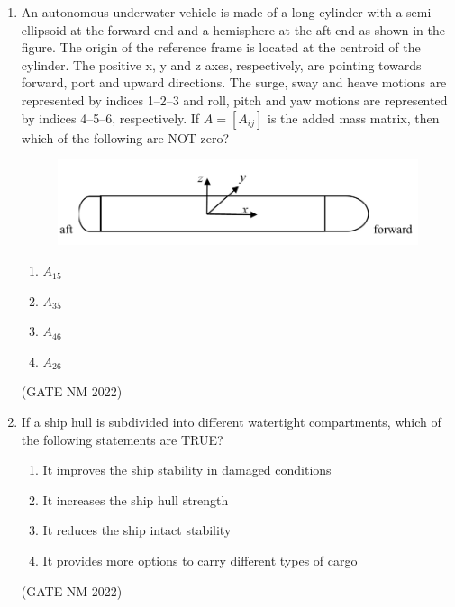 \documentclass[journal,12pt,onecolumn]{IEEEtran}
\theoremstyle{remark}
\begin{document}
\begin{enumerate}
\item  An autonomous underwater vehicle is made of a long cylinder with a semi-ellipsoid at the forward end and a hemisphere at the aft end as shown in the figure.  
The origin of the reference frame is located at the centroid of the cylinder.  
The positive x, y and z axes, respectively, are pointing towards forward, port and upward directions.  
The surge, sway and heave motions are represented by indices 1--2--3 and roll, pitch and yaw motions are represented by indices 4--5--6, respectively.  
If $A = [A_{ij}]$ is the added mass matrix, then which of the following are NOT zero?
\newpage
\begin{figure}[h]
	\centering
	\includegraphics[width=0.3\columnwidth]{fig6}
	\caption{}
	\label{fig:placeholder}
\end{figure}
\begin{multicols}{4}
\begin{enumerate}
    \item  $A_{15}$
    \item  $A_{35}$
    \item  $A_{46}$
    \item  $A_{26}$
\end{enumerate}
\end{multicols}

\hfill(GATE NM 2022)

\item  If a ship hull is subdivided into different watertight compartments, which of the following statements are TRUE?
\begin{enumerate}
    \item It improves the ship stability in damaged conditions
    \item It increases the ship hull strength
    \item It reduces the ship intact stability
    \item It provides more options to carry different types of cargo
\end{enumerate}

\hfill(GATE NM 2022)


\end{enumerate}
\end{document}
